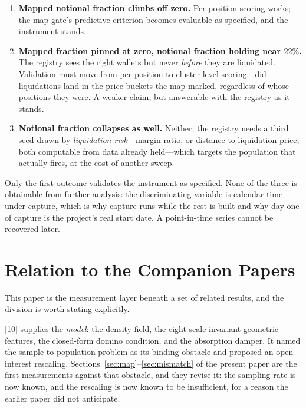 \documentclass[11pt,a4paper]{article}
\theoremstyle{definition}
\theoremstyle{plain}
\begin{document}
\begin{enumerate}
  \item \textbf{Mapped notional fraction climbs off zero.} Per-position scoring works; the map gate's
        predictive criterion becomes evaluable as specified, and the instrument stands.
  \item \textbf{Mapped fraction pinned at zero, notional fraction holding near $22\%$.} The registry
        sees the right wallets but never \emph{before} they are liquidated. Validation must move from
        per-position to cluster-level scoring---did liquidations land in the price buckets the map
        marked, regardless of whose positions they were. A weaker claim, but answerable with the
        registry as it stands.
  \item \textbf{Notional fraction collapses as well.} Neither; the registry needs a third seed drawn
        by \emph{liquidation risk}---margin ratio, or distance to liquidation price, both computable
        from data already held---which targets the population that actually fires, at the cost of
        another sweep.
\end{enumerate}

Only the first outcome validates the instrument as specified. None of the three is obtainable from
further analysis: the discriminating variable is calendar time under capture, which is why capture
runs while the rest is built and why day one of capture is the project's real start date. A
point-in-time series cannot be recovered later.

\section{Relation to the Companion Papers}
\label{sec:companions}

This paper is the measurement layer beneath a set of related results, and the division is worth
stating explicitly.

[10] supplies the \emph{model}: the density field, the eight scale-invariant geometric
features, the closed-form domino condition, and the absorption damper. It named the
sample-to-population problem as its binding obstacle and proposed an open-interest rescaling.
Sections~\ref{sec:map}--\ref{sec:mismatch} of the present paper are the first measurements against
that obstacle, and they revise it: the sampling rate is now known, and the rescaling is now known to
be insufficient, for a reason the earlier paper did not anticipate.
\end{document}
